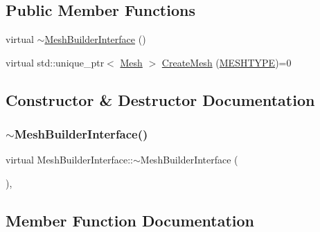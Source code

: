 \subsection*{Public Member Functions}
\begin{DoxyCompactItemize}
\item 
virtual \mbox{\hyperlink{class_mesh_builder_interface_a28fb0d634106aaac150e1314e7c9c876}{$\sim$\+Mesh\+Builder\+Interface}} ()
\item 
virtual std\+::unique\+\_\+ptr$<$ \mbox{\hyperlink{class_mesh}{Mesh}} $>$ \mbox{\hyperlink{class_mesh_builder_interface_a2d9b31466ef198b2029438970af81323}{Create\+Mesh}} (\mbox{\hyperlink{_mesh_builder_interface_8h_ad6436347ddb93aed826a19081b53dd61}{M\+E\+S\+H\+T\+Y\+PE}})=0
\end{DoxyCompactItemize}


\subsection{Constructor \& Destructor Documentation}
\mbox{\label{class_mesh_builder_interface_a28fb0d634106aaac150e1314e7c9c876}} 
\subsubsection{\texorpdfstring{$\sim$MeshBuilderInterface()}{~MeshBuilderInterface()}}
{\footnotesize\ttfamily virtual Mesh\+Builder\+Interface\+::$\sim$\+Mesh\+Builder\+Interface (\begin{DoxyParamCaption}{ }\end{DoxyParamCaption})\hspace{0.3cm}{\ttfamily [inline]}, {\ttfamily [virtual]}}



\subsection{Member Function Documentation}
\mbox{\label{class_mesh_builder_interface_a2d9b31466ef198b2029438970af81323}} 
